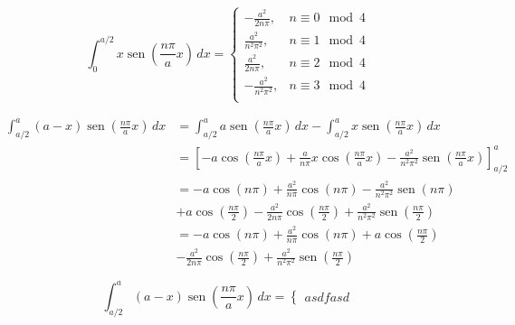 \documentclass[12pt, a4paper, portuguese]{fphw}
\DeclareMathOperator{\sen}{sen}
\begin{document}
$$
\int_{0}^{a/2} x \sen \left( \frac{n \pi}{a} x \right)\, dx
= \begin{cases}
-\frac{a^2}{2n \pi},    & n \equiv 0 \mod 4 \\
\frac{a^2}{n^2 \pi^2},  & n \equiv 1 \mod 4 \\
\frac{a^2}{2n \pi},     & n \equiv 2 \mod 4 \\
-\frac{a^2}{n^2 \pi^2}, & n \equiv 3 \mod 4 \\
\end{cases}
$$

$$
\begin{aligned}
\int_{a/2}^{a} \left( a - x \right) \sen \left( \frac{n \pi}{a} x \right)\, dx &= \int_{a/2}^{a} a \sen \left( \frac{n \pi}{a} x \right)\, dx - \int_{a/2}^{a} x \sen \left( \frac{n \pi}{a} x \right)\, dx \\
&=
\left[
-a \cos \left( \frac{n \pi}{a} x \right)
+\frac{a}{n \pi}x
\cos \left( \frac{n\pi}{a}x \right)
-
\frac{a^2}{n^2 \pi^2}
\sen \left( \frac{n\pi}{a}x \right)
\right]_{a/2}^a \\
&=
-a \cos \left( n \pi \right)
+\frac{a^2}{n \pi}
\cos \left( n\pi \right)
-
\frac{a^2}{n^2 \pi^2}
\sen \left( n\pi \right) \\
&+
a \cos \left( \frac{n \pi}{2} \right)
-\frac{a^2}{2n \pi}
\cos \left( \frac{n\pi}{2} \right)
+
\frac{a^2}{n^2 \pi^2}
\sen \left( \frac{n\pi}{2} \right) \\
&=
-a \cos \left( n \pi \right)
+\frac{a^2}{n \pi}
\cos \left( n\pi \right)
+ a \cos \left( \frac{n \pi}{2} \right) \\
&-\frac{a^2}{2n \pi}
\cos \left( \frac{n\pi}{2} \right)
+
\frac{a^2}{n^2 \pi^2}
\sen \left( \frac{n\pi}{2} \right)
\end{aligned}
$$

$$
\int_{a/2}^{a} \left( a - x \right) \sen \left( \frac{n \pi}{a} x \right)\, dx =
\begin{cases}
asdfasd
\end{cases}
$$
\end{document}
